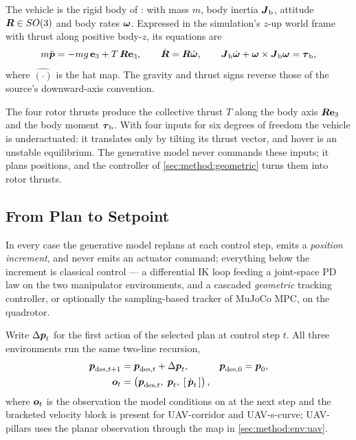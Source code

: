 The vehicle is the rigid body of \parencite[Eqs.~(2)--(5)]{lee2010geometric}: with mass $m$, body
inertia $\boldsymbol{J}_{\textrm{b}}$, attitude $\boldsymbol{R}\in SO(3)$ and body rates $\boldsymbol{\omega}$.
Expressed in the simulation's $z$-up world frame with thrust along positive body-$z$, its equations are
\begin{equation}\label{eq:method:dep:plant}
  m\ddot{\boldsymbol{p}} = -m g\,\textbf{e}_{3} + T\,\boldsymbol{R}\textbf{e}_{3},
  \qquad
  \dot{\boldsymbol{R}} = \boldsymbol{R}\hat{\boldsymbol{\omega}},
  \qquad
  \boldsymbol{J}_{\textrm{b}}\dot{\boldsymbol{\omega}} + \boldsymbol{\omega}\times\boldsymbol{J}_{\textrm{b}}\boldsymbol{\omega} = \boldsymbol{\tau}_{\textrm{b}},
\end{equation}
where $\hat{(\cdot)}$ is the hat map. The gravity and thrust signs reverse those of the
source's downward-axis convention.

The four rotor thrusts produce the collective thrust $T$ along the body axis $\boldsymbol{R}\textbf{e}_{3}$ and
the body moment $\boldsymbol{\tau}_{\textrm{b}}$. With four inputs for six degrees of freedom the vehicle is
underactuated: it translates only by tilting its thrust vector, and hover is an unstable equilibrium.
The generative model never commands these inputs; it plans positions, and the controller of
\autoref{sec:method:geometric} turns them into rotor thrusts.

\subsection{From Plan to Setpoint}\label{sec:method:setpoint}

In every case the generative model replans at each control step, emits a \emph{position increment},
and never emits an actuator command; everything below the increment is classical control --- a
differential \ac{IK} loop feeding a joint-space PD law on the two manipulator environments, and a
cascaded \emph{geometric} tracking controller, or optionally the sampling-based tracker of MuJoCo MPC,
on the quadrotor.

Write $\Delta\boldsymbol{p}_{t}$ for the first action of the selected plan at control step $t$. All three
environments run the same two-line recursion,
\begin{align}
  \boldsymbol{p}_{\textrm{des},t+1} &= \boldsymbol{p}_{\textrm{des},t} + \Delta\boldsymbol{p}_{t},
    &&\boldsymbol{p}_{\textrm{des},0} = \boldsymbol{p}_{0},
    \label{eq:method:dep:setpoint}\\
  \boldsymbol{o}_{t} &= \left(\boldsymbol{p}_{\textrm{des},t},\;\boldsymbol{p}_{t},\;[\,\dot{\boldsymbol{p}}_{t}\,]\right),
    \label{eq:method:dep:obs}
\end{align}
where $\boldsymbol{o}_{t}$ is the observation the model conditions on at the next step and the bracketed
velocity block is present for UAV-corridor and UAV-s-curve; UAV-pillars uses the planar
observation through the map in \autoref{sec:method:env:uav}.

